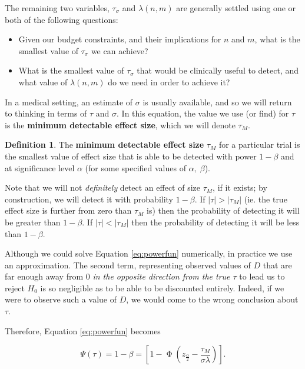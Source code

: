 \documentclass[
  openany]{book}
\providecommand{\tightlist}{%
  \setlength{\itemsep}{0pt}\setlength{\parskip}{0pt}}
\theoremstyle{definition}
\newtheorem{definition}{Definition}[chapter]
\theoremstyle{definition}
\theoremstyle{definition}
\theoremstyle{definition}
\theoremstyle{remark}
\begin{document}
The remaining two variables, \(\tau_\sigma\) and \(\lambda\left(n,m\right)\) are generally settled using one or both of the following questions:

\begin{itemize}
\tightlist
\item
  Given our budget constraints, and their implications for \(n\) and \(m\), what is the smallest value of \(\tau_\sigma\) we can achieve?
\item
  What is the smallest value of \(\tau_\sigma\) that would be clinically useful to detect, and what value of \(\lambda\left(n,m\right)\) do we need in order to achieve it?
\end{itemize}

In a medical setting, an estimate of \(\sigma\) is usually available, and so we will return to thinking in terms of \(\tau\) and \(\sigma\). In this equation, the value we use (or find) for \(\tau\) is the \textbf{minimum detectable effect size}, which we will denote \(\tau_M\).

\begin{definition}
The \textbf{minimum detectable effect size} \(\tau_M\) for a particular trial is the smallest value of effect size that is able to be detected with power \(1-\beta\) and at significance level \(\alpha\) (for some specified values of \(\alpha,\;\beta\)).
\end{definition}

Note that we will not \emph{definitely} detect an effect of size \(\tau_M\), if it exists; by construction, we will detect it with probability \(1-\beta\). If \(|\tau| > |\tau_M|\) (ie. the true effect size is further from zero than \(\tau_M\) is) then the probability of detecting it will be greater than \(1-\beta\). If \(|\tau| < |\tau_M|\) then the probability of detecting it will be less than \(1-\beta\).

Although we could solve Equation \eqref{eq:powerfun} numerically, in practice we use an approximation. The second term, representing observed values of \(D\) that are far enough away from 0 \emph{in the opposite direction from the true \(\tau\)} to lead us to reject \(H_0\) is so negligible as to be able to be discounted entirely. Indeed, if we were to observe such a value of \(D\), we would come to the wrong conclusion about \(\tau\).

Therefore, Equation \eqref{eq:powerfun} becomes

\begin{equation}
\Psi\left(\tau\right) = 1-\beta = \left[1 - \operatorname{\Phi}\left(z_{\frac{\alpha}{2}} - \frac{\tau_M}{\sigma\lambda}\right)\right].
\label{eq:powerfun2}
\end{equation}
\end{document}
